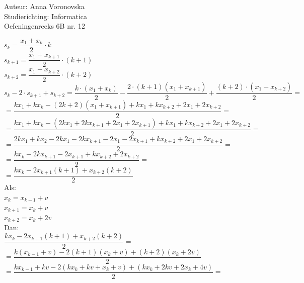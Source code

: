 \documentclass[a4paper]{article}
\begin{document}
  
\noindent \large Auteur: Anna Voronovska \\
\noindent \large Studierichting: Informatica\\
\noindent \large Oefeningenreeks 6B nr. 12\\

\medskip

\normalsize

$s_k=\dfrac{x_1+x_k}{2} \cdot k$\\

$s_{k+1}=\dfrac{x_1+x_{k+1}}{2} \cdot (k+1)$\\

$s_{k+2}=\dfrac{x_1+x_{k+2}}{2} \cdot (k+2)$\\	

$s_k-2 \cdot s_{k+1} + s_{k+2}= \dfrac{k \cdot (x_1+x_k)}{2} - \dfrac{2 \cdot (k+1) (x_1+x_{k+1})}{2}+\dfrac{(k+2) \cdot (x_1+x_{k+2})}{2}= $\\

$= \dfrac{kx_1+kx_k - (2k+2)(x_1+x_{k+1}) + kx_1 + kx_{k+2}+ 2x_1 + 2x_{k+2}}{2}=$\\

$= \dfrac{kx_1+kx_k - (2kx_1 + 2kx_{k+1}+2x_1 + 2x_{k+1})+kx_1+kx_{k+2}+2x_1+2x_{k+2}}{2}=$\\

$=\dfrac{2kx_1+kx_2-2kx_1-2kx_{k+1} -2x_1 -2x_{k+1} +kx_{k+2}+2x_1 +2x_{k+2}}{2}=$\\

$=\dfrac{kx_k-2kx_{k+1}-2x_{k+1}+kx_{k+2}+2x_{k+2}}{2}=$\\

$=\dfrac{kx_k-2x_{k+1}(k+1)+x_{k+2}(k+2)}{2}$\\

Als:\\

$x_k=x_{k-1}+v$\\

$x_{k+1}=x_k+v$\\

$x_{k+2}=x_k+2v$\\	

Dan:\\

$\dfrac{kx_k-2x_{k+1}(k+1)+x_{k+2}(k+2)}{2} =$\\

$=\dfrac{k(x_{k-1}+v)-2(k+1)(x_k+v)+(k+2)(x_k+2v)}{2}$\\

$=\dfrac{kx_{k-1}+kv-2(kx_k+kv+x_k+v)+(kx_k+2kv+2x_k+4v)}{2}=$\\
\end{document}
